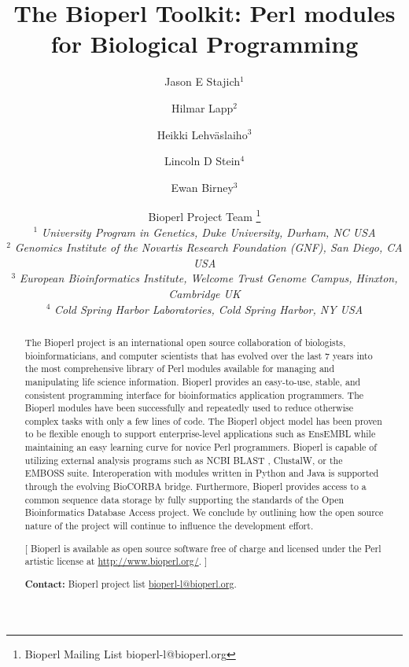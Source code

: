 \documentclass[12pt]{article}
\begin{document}
\doublespacing

\title{The Bioperl Toolkit: Perl modules for Biological Programming}
\author{Jason E Stajich$^1$ \and
Hilmar Lapp$^2$ \and
Heikki Lehv\"{a}slaiho$^3$ \and 
Lincoln D Stein$^4$ \and Ewan Birney$^3$ \and
Bioperl Project Team \thanks{Bioperl Mailing List bioperl-l@bioperl.org} \\
$^1$ \small{\textit{University Program in Genetics, Duke University,  Durham, NC USA}} \\
$^2$ \small{\textit{Genomics Institute of the Novartis Research
Foundation (GNF), San Diego, CA USA}} \\
$^3$ \small{\textit{European Bioinformatics Institute, Welcome Trust
Genome Campus, Hinxton, Cambridge UK}} \\
$^4$ \small{\textit{Cold Spring Harbor Laboratories, Cold Spring Harbor, NY USA }}\\
}
\maketitle
\begin{abstract}

The Bioperl project is an international open source collaboration of
biologists, bioinformaticians, and computer scientists that has
evolved over the last 7 years into the most comprehensive library of
Perl modules available for managing and manipulating life science information.
Bioperl provides an easy-to-use, stable, and consistent programming
interface for bioinformatics application programmers.  The Bioperl
modules have been successfully and repeatedly used to reduce
otherwise complex tasks with only a few lines of code.  The Bioperl
object model has been proven to be flexible enough to support
enterprise-level applications such as EnsEMBL while maintaining an
easy learning curve for novice Perl programmers.  Bioperl is capable
of utilizing external analysis programs such as NCBI BLAST , ClustalW,
or the EMBOSS suite.  Interoperation with modules written in Python
and Java is supported through the evolving BioCORBA bridge.
Furthermore, Bioperl provides access to a common sequence data storage
by fully supporting the standards of the Open Bioinformatics Database
Access project.  We conclude by outlining how the open source nature of
the project will continue to influence the development effort.

[ Bioperl is available as open source software free of charge and
licensed under the Perl artistic license at \url{http://www.bioperl.org/}. ]

\textbf{Contact:} Bioperl project list \url{bioperl-l@bioperl.org}.

\end{abstract}
\end{document}
